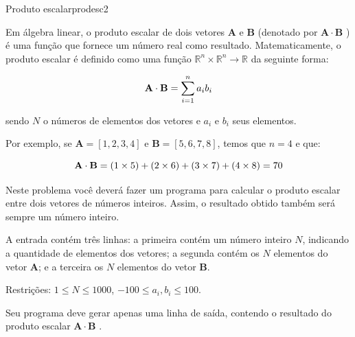 \documentclass[12pt,a4paper,oneside]{article}
\begin{document}
\begin{problem}{Produto escalar}{prodesc}{2}

Em álgebra linear, o produto escalar de dois vetores $\mathbf{A}$ e $\mathbf{B}$ (denotado por $\mathbf{A} \cdot \mathbf{B}$ ) é uma função que fornece um número real como resultado. Matematicamente, o produto escalar é definido como uma função $\mathbb{R}^n \times \mathbb{R}^n \rightarrow \mathbb{R}$ da seguinte forma:

\begin{equation}
    \mathbf{A} \cdot \mathbf{B} = \sum_{i=1}^{n} a_ib_i \notag
\end{equation}

sendo $N$ o números de elementos dos vetores e $a_i$ e $b_i$ seus elementos.

Por exemplo, se $\mathbf{A} = [1,2,3,4]$ e $\mathbf{B} = [5,6,7,8]$, temos que $n=4$  e que:

\begin{equation}
    \mathbf{A} \cdot \mathbf{B} = (1 \times 5) + (2 \times 6) + (3 \times 7) + (4 \times 8) = 70 \notag
\end{equation}

Neste problema você deverá fazer um programa para calcular o produto escalar entre dois vetores de números inteiros. Assim, o resultado obtido também será sempre um número inteiro.

%

\InputFile

A entrada contém três linhas: a primeira contém um número inteiro $N$, indicando a quantidade de elementos dos vetores; a segunda contém os $N$ elementos do vetor $\mathbf{A}$; e a terceira os $N$ elementos do vetor $\mathbf{B}$.

Restrições: $1 \leq N \leq 1000$, $-100 \leq a_i, b_i \leq 100$.



\OutputFile

Seu programa deve gerar apenas uma linha de saída, contendo o resultado do produto escalar $\mathbf{A} \cdot \mathbf{B}$ .



\Example

\begin{example}
%
\end{example}

\begin{example}
%
\end{example}

\begin{example}
%
\end{example}




\end{problem}
\end{document}

